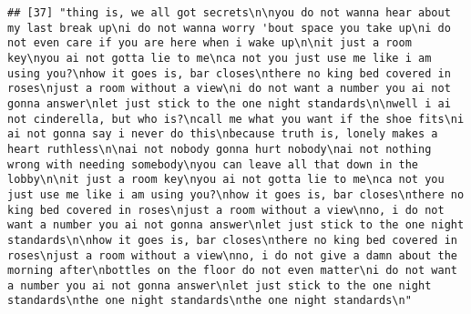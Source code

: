 \documentclass[]{article}
\begin{document}
\begin{verbatim}
## [37] "thing is, we all got secrets\n\nyou do not wanna hear about my last break up\ni do not wanna worry 'bout space you take up\ni do not even care if you are here when i wake up\n\nit just a room key\nyou ai not gotta lie to me\nca not you just use me like i am using you?\nhow it goes is, bar closes\nthere no king bed covered in roses\njust a room without a view\ni do not want a number you ai not gonna answer\nlet just stick to the one night standards\n\nwell i ai not cinderella, but who is?\ncall me what you want if the shoe fits\ni ai not gonna say i never do this\nbecause truth is, lonely makes a heart ruthless\n\nai not nobody gonna hurt nobody\nai not nothing wrong with needing somebody\nyou can leave all that down in the lobby\n\nit just a room key\nyou ai not gotta lie to me\nca not you just use me like i am using you?\nhow it goes is, bar closes\nthere no king bed covered in roses\njust a room without a view\nno, i do not want a number you ai not gonna answer\nlet just stick to the one night standards\n\nhow it goes is, bar closes\nthere no king bed covered in roses\njust a room without a view\nno, i do not give a damn about the morning after\nbottles on the floor do not even matter\ni do not want a number you ai not gonna answer\nlet just stick to the one night standards\nthe one night standards\nthe one night standards\n"                                                                                                                                                                                                                                                                                                                                                                                                                                                                                                                                                                                                                                                                                                                                                                                                                                                                                                                                                                                                                                                                                                                                                                                                                                                                                                                                                                                                                                                                                                                                                                             

\end{verbatim}
\end{document}
